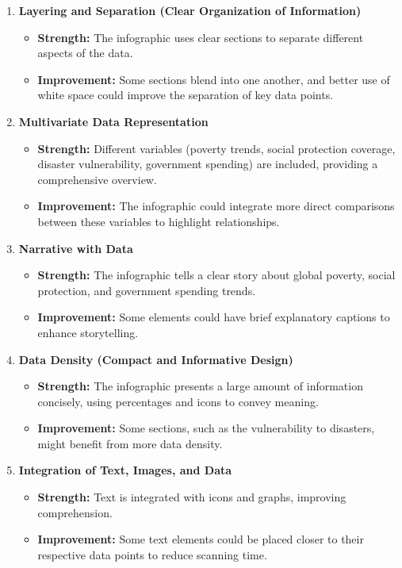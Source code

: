 \documentclass[11pt,a4paper,titlepage]{article}
\begin{document}
\begin{enumerate}
\begin{enumerate}
\begin{enumerate}
\begin{enumerate}
        \item \textbf{Layering and Separation (Clear Organization of Information)}
        \begin{itemize}
            \item \textbf{Strength:} The infographic uses clear sections to separate different aspects of the data.
            \item \textbf{Improvement:} Some sections blend into one another, and better use of white space could improve the separation of key data points.
        \end{itemize}

        \item \textbf{Multivariate Data Representation}
        \begin{itemize}
            \item \textbf{Strength:} Different variables (poverty trends, social protection coverage, disaster vulnerability, government spending) are included, providing a comprehensive overview.
            \item \textbf{Improvement:} The infographic could integrate more direct comparisons between these variables to highlight relationships.
        \end{itemize}

        \item \textbf{Narrative with Data}
        \begin{itemize}
            \item \textbf{Strength:} The infographic tells a clear story about global poverty, social protection, and government spending trends.
            \item \textbf{Improvement:} Some elements could have brief explanatory captions to enhance storytelling.
        \end{itemize}

        \item \textbf{Data Density (Compact and Informative Design)}
        \begin{itemize}
            \item \textbf{Strength:} The infographic presents a large amount of information concisely, using percentages and icons to convey meaning.
            \item \textbf{Improvement:} Some sections, such as the vulnerability to disasters, might benefit from more data density.
        \end{itemize}

        \item \textbf{Integration of Text, Images, and Data}
        \begin{itemize}
            \item \textbf{Strength:} Text is integrated with icons and graphs, improving comprehension.
            \item \textbf{Improvement:} Some text elements could be placed closer to their respective data points to reduce scanning time.
        \end{itemize}


\end{enumerate}
\end{enumerate}
\end{enumerate}
\end{enumerate}
\end{document}
